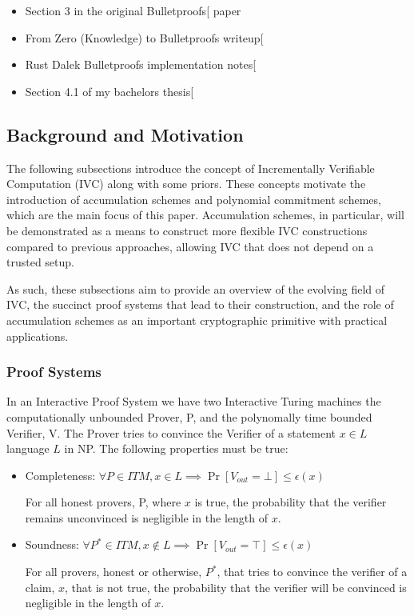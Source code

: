\documentclass[
]{article}
\providecommand{\tightlist}{%
  \setlength{\itemsep}{0pt}\setlength{\parskip}{0pt}}
\begin{document}
\begin{itemize}
\tightlist
\item
  Section 3 in the original
  Bulletproofs{[}\citeproc{ref-bulletproofs}{Bünz et al. 2017}{]} paper
\item
  From Zero (Knowledge) to Bulletproofs
  writeup{[}\citeproc{ref-from0k2bp}{Gibson 2022}{]}
\item
  Rust Dalek Bulletproofs implementation
  notes{[}\citeproc{ref-dalek-docs}{Valence et al. 2023}{]}
\item
  Section 4.1 of my bachelors
  thesis{[}\citeproc{ref-hacspec-bulletproofs}{Jakobsen and Larsen
  2022}{]}
\end{itemize}

\subsection{Background and Motivation}\label{background-and-motivation}

The following subsections introduce the concept of Incrementally
Verifiable Computation (IVC) along with some priors. These concepts
motivate the introduction of accumulation schemes and polynomial
commitment schemes, which are the main focus of this paper. Accumulation
schemes, in particular, will be demonstrated as a means to construct
more flexible IVC constructions compared to previous approaches,
allowing IVC that does not depend on a trusted setup.

As such, these subsections aim to provide an overview of the evolving
field of IVC, the succinct proof systems that lead to their
construction, and the role of accumulation schemes as an important
cryptographic primitive with practical applications.

\subsubsection{Proof Systems}\label{proof-systems}

In an Interactive Proof System we have two Interactive Turing machines
the computationally unbounded Prover, P, and the polynomally time
bounded Verifier, V. The Prover tries to convince the Verifier of a
statement \(x \in L\) language \(L\) in NP. The following properties
must be true:

\begin{itemize}
\item
  Completeness:
  \(\forall P \in ITM, x\in L \implies \Pr[V_{out} = \bot] \leq \epsilon(x)\)

  For all honest provers, P, where \(x\) is true, the probability that
  the verifier remains unconvinced is negligible in the length of \(x\).
\item
  Soundness:
  \(\forall P^* \in ITM, x \notin L \implies \Pr[V_{out} = \top] \leq \epsilon(x)\)

  For all provers, honest or otherwise, \(P^*\), that tries to convince
  the verifier of a claim, \(x\), that is not true, the probability that
  the verifier will be convinced is negligible in the length of \(x\).
\end{itemize}
\end{document}
